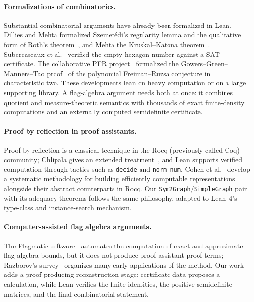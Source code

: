 \documentclass{article}
\newcommand{\lean}[1]{\texttt{#1}}
\begin{document}
\paragraph{Formalizations of combinatorics.}
Substantial combinatorial arguments have already been formalized in Lean.
Dillies and Mehta formalized Szemer\'edi's regularity lemma and the
qualitative form of Roth's theorem~\cite{dillies2022szemeredi}, and Mehta
the Kruskal--Katona theorem~\cite{mehta2022kruskal}.  Subercaseaux et
al.~\cite{subercaseaux2024hexagon} verified the empty-hexagon number against
a SAT certificate.  The collaborative PFR project~\cite{pfr2023} formalized
the Gowers--Green--Manners--Tao proof~\cite{gowers2025marton} of the
polynomial Freiman--Ruzsa conjecture in characteristic two.  These developments lean on heavy
computation or on a large supporting library.  A flag-algebra argument needs
both at once: it combines quotient and measure-theoretic semantics with
thousands of exact finite-density computations and an externally computed
semidefinite certificate.

\paragraph{Proof by reflection in proof assistants.}
Proof by reflection is a classical technique in the Rocq (previously called
Coq) community; Chlipala
gives an extended treatment~\cite{chlipala2013cpdt}, and Lean supports
verified computation through tactics such as \lean{decide} and
\lean{norm\_num}.  Cohen et al.~\cite{cohen2013refinements} develop
a systematic methodology for building efficiently computable representations
alongside their abstract counterparts in Rocq.  Our
\lean{Sym2Graph}/\lean{SimpleGraph} pair with its adequacy theorems follows
the same philosophy, adapted to Lean~4's type-class and instance-search
mechanism.

\paragraph{Computer-assisted flag algebra arguments.}
The Flagmatic software~\cite{vaughan2013flagmatic} automates the computation
of exact and approximate flag-algebra bounds, but it does not produce
proof-assistant proof terms; Razborov's survey~\cite{razborov2013flag}
organizes many early applications of the method.  Our work adds a
proof-producing reconstruction stage: certificate data proposes a
calculation, while Lean verifies the finite identities, the
positive-semidefinite matrices, and the final combinatorial statement.
\end{document}

